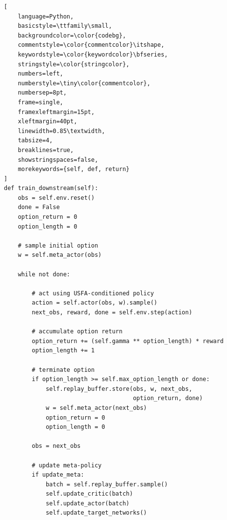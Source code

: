 \documentclass{article}
\theoremstyle{plain}
\theoremstyle{definition}
\theoremstyle{remark}
\begin{document}
\begin{lstlisting}[
    language=Python,
    basicstyle=\ttfamily\small,
    backgroundcolor=\color{codebg},
    commentstyle=\color{commentcolor}\itshape,
    keywordstyle=\color{keywordcolor}\bfseries,
    stringstyle=\color{stringcolor},
    numbers=left,
    numberstyle=\tiny\color{commentcolor},
    numbersep=8pt,
    frame=single,
    framexleftmargin=15pt,
    xleftmargin=40pt,
    linewidth=0.85\textwidth,
    tabsize=4,
    breaklines=true,
    showstringspaces=false,
    morekeywords={self, def, return}
]
def train_downstream(self):
    obs = self.env.reset()
    done = False
    option_return = 0
    option_length = 0

    # sample initial option
    w = self.meta_actor(obs)

    while not done:

        # act using USFA-conditioned policy
        action = self.actor(obs, w).sample()
        next_obs, reward, done = self.env.step(action)

        # accumulate option return
        option_return += (self.gamma ** option_length) * reward
        option_length += 1

        # terminate option
        if option_length >= self.max_option_length or done:
            self.replay_buffer.store(obs, w, next_obs,
                                     option_return, done)
            w = self.meta_actor(next_obs)
            option_return = 0
            option_length = 0

        obs = next_obs

        # update meta-policy
        if update_meta:
            batch = self.replay_buffer.sample()
            self.update_critic(batch)
            self.update_actor(batch)
            self.update_target_networks()
\end{lstlisting}
\end{document}

